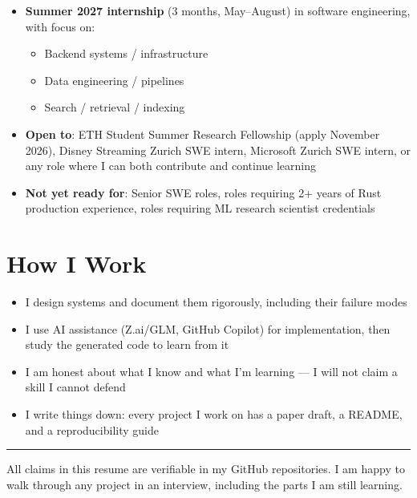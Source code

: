 \documentclass[11pt,a4paper]{article}
\begin{document}
\begin{itemize}
\item \textbf{Summer 2027 internship} (3 months, May--August) in software engineering, with focus on:
  \begin{itemize}
  \item Backend systems / infrastructure
  \item Data engineering / pipelines
  \item Search / retrieval / indexing
  \end{itemize}
\item \textbf{Open to}: ETH Student Summer Research Fellowship (apply November 2026), Disney Streaming Zurich SWE intern, Microsoft Zurich SWE intern, or any role where I can both contribute and continue learning
\item \textbf{Not yet ready for}: Senior SWE roles, roles requiring 2+ years of Rust production experience, roles requiring ML research scientist credentials
\end{itemize}

\section*{How I Work}

\begin{itemize}
\item I design systems and document them rigorously, including their failure modes
\item I use AI assistance (Z.ai/GLM, GitHub Copilot) for implementation, then study the generated code to learn from it
\item I am honest about what I know and what I'm learning --- I will not claim a skill I cannot defend
\item I write things down: every project I work on has a paper draft, a README, and a reproducibility guide
\end{itemize}

\vspace{6pt}
\hrule
\vspace{4pt}
{\footnotesize All claims in this resume are verifiable in my GitHub repositories. I am happy to walk through any project in an interview, including the parts I am still learning.}
\end{document}
